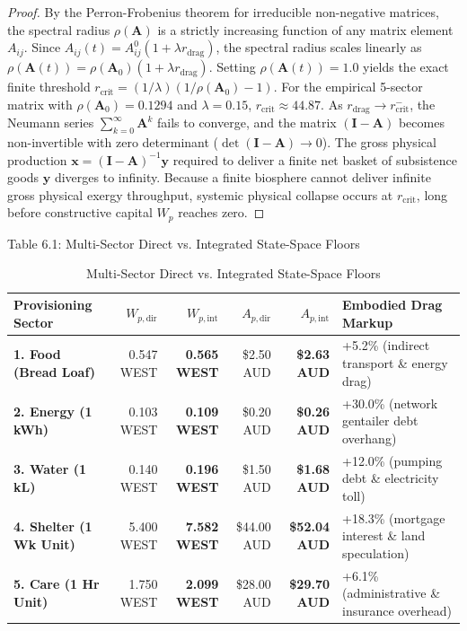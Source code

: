 \documentclass[preprint,12pt,authoryear]{elsarticle}
\theoremstyle{definition}
\begin{document}
\begin{proof}
By the Perron-Frobenius theorem for irreducible non-negative matrices, the spectral radius $\rho(\mathbf{A})$ is a strictly increasing function of any matrix element $A_{ij}$. Since $A_{ij}(t) = A_{ij}^0 (1 + \lambda r_{\text{drag}})$, the spectral radius scales linearly as $\rho(\mathbf{A}(t)) = \rho(\mathbf{A}_0)(1 + \lambda r_{\text{drag}})$. Setting $\rho(\mathbf{A}(t)) = 1.0$ yields the exact finite threshold $r_{\text{crit}} = (1/\lambda)(1/\rho(\mathbf{A}_0) - 1)$. For the empirical 5-sector matrix with $\rho(\mathbf{A}_0) = 0.1294$ and $\lambda = 0.15$, $r_{\text{crit}} \approx 44.87$. As $r_{\text{drag}} \to r_{\text{crit}}^-$, the Neumann series $\sum_{k=0}^\infty \mathbf{A}^k$ fails to converge, and the matrix $(\mathbf{I} - \mathbf{A})$ becomes non-invertible with zero determinant ($\det(\mathbf{I} - \mathbf{A}) \to 0$). The gross physical production $\mathbf{x} = (\mathbf{I} - \mathbf{A})^{-1} \mathbf{y}$ required to deliver a finite net basket of subsistence goods $\mathbf{y}$ diverges to infinity. Because a finite biosphere cannot deliver infinite gross physical exergy throughput, systemic physical collapse occurs at $r_{\text{crit}}$, long before constructive capital $W_p$ reaches zero.
\end{proof}

Table 6.1: Multi-Sector Direct vs. Integrated State-Space Floors

\begin{table}[htbp]
\centering
\small
\caption{Multi-Sector Direct vs. Integrated State-Space Floors}
\label{tab:table6_1}
\begin{tabularx}{\textwidth}{l r r r r p{4.2cm}}
\toprule
\textbf{Provisioning Sector} & \textbf{$W_{p, \text{dir}}$} & \textbf{$W_{p, \text{int}}$} & \textbf{$A_{p, \text{dir}}$} & \textbf{$A_{p, \text{int}}$} & \textbf{Embodied Drag Markup} \\
\midrule
\textbf{1. Food (Bread Loaf)} & 0.547 WEST & \textbf{0.565 WEST} & \$2.50 AUD & \textbf{\$2.63 AUD} & +5.2\% (indirect transport \& energy drag) \\
\textbf{2. Energy (1 kWh)} & 0.103 WEST & \textbf{0.109 WEST} & \$0.20 AUD & \textbf{\$0.26 AUD} & +30.0\% (network gentailer debt overhang) \\
\textbf{3. Water (1 kL)} & 0.140 WEST & \textbf{0.196 WEST} & \$1.50 AUD & \textbf{\$1.68 AUD} & +12.0\% (pumping debt \& electricity toll) \\
\textbf{4. Shelter (1 Wk Unit)} & 5.400 WEST & \textbf{7.582 WEST} & \$44.00 AUD & \textbf{\$52.04 AUD} & +18.3\% (mortgage interest \& land speculation) \\
\textbf{5. Care (1 Hr Unit)} & 1.750 WEST & \textbf{2.099 WEST} & \$28.00 AUD & \textbf{\$29.70 AUD} & +6.1\% (administrative \& insurance overhead) \\
\bottomrule
\end{tabularx}
\end{table}
\end{document}
